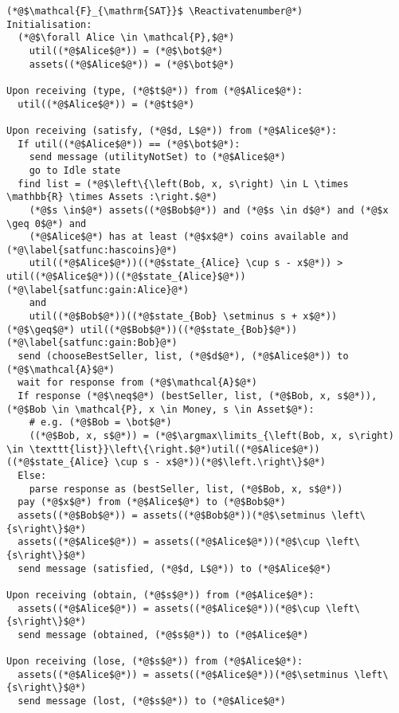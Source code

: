 \Suppressnumber
\begin{lstlisting}[label=satfunc, style=numbers]
(*@$\mathcal{F}_{\mathrm{SAT}}$ \Reactivatenumber@*)
Initialisation:
  (*@$\forall Alice \in \mathcal{P},$@*)
    util((*@$Alice$@*)) = (*@$\bot$@*)
    assets((*@$Alice$@*)) = (*@$\bot$@*)

Upon receiving (type, (*@$t$@*)) from (*@$Alice$@*):
  util((*@$Alice$@*)) = (*@$t$@*)

Upon receiving (satisfy, (*@$d, L$@*)) from (*@$Alice$@*):
  If util((*@$Alice$@*)) == (*@$\bot$@*):
    send message (utilityNotSet) to (*@$Alice$@*)
    go to Idle state
  find list = (*@$\left\{\left(Bob, x, s\right) \in L \times \mathbb{R} \times Assets :\right.$@*)
    (*@$s \in$@*) assets((*@$Bob$@*)) and (*@$s \in d$@*) and (*@$x \geq 0$@*) and
    (*@$Alice$@*) has at least (*@$x$@*) coins available and (*@\label{satfunc:hascoins}@*)
    util((*@$Alice$@*))((*@$state_{Alice} \cup s - x$@*)) > util((*@$Alice$@*))((*@$state_{Alice}$@*)) (*@\label{satfunc:gain:Alice}@*)
    and
    util((*@$Bob$@*))((*@$state_{Bob} \setminus s + x$@*)) (*@$\geq$@*) util((*@$Bob$@*))((*@$state_{Bob}$@*)) (*@\label{satfunc:gain:Bob}@*)
  send (chooseBestSeller, list, (*@$d$@*), (*@$Alice$@*)) to (*@$\mathcal{A}$@*)
  wait for response from (*@$\mathcal{A}$@*)
  If response (*@$\neq$@*) (bestSeller, list, (*@$Bob, x, s$@*)), (*@$Bob \in \mathcal{P}, x \in Money, s \in Asset$@*):
    # e.g. (*@$Bob = \bot$@*)
    ((*@$Bob, x, s$@*)) = (*@$\argmax\limits_{\left(Bob, x, s\right) \in \texttt{list}}\left\{\right.$@*)util((*@$Alice$@*))((*@$state_{Alice} \cup s - x$@*))(*@$\left.\right\}$@*)
  Else:
    parse response as (bestSeller, list, (*@$Bob, x, s$@*))
  pay (*@$x$@*) from (*@$Alice$@*) to (*@$Bob$@*)
  assets((*@$Bob$@*)) = assets((*@$Bob$@*))(*@$\setminus \left\{s\right\}$@*)
  assets((*@$Alice$@*)) = assets((*@$Alice$@*))(*@$\cup \left\{s\right\}$@*)
  send message (satisfied, (*@$d, L$@*)) to (*@$Alice$@*)

Upon receiving (obtain, (*@$s$@*)) from (*@$Alice$@*):
  assets((*@$Alice$@*)) = assets((*@$Alice$@*))(*@$\cup \left\{s\right\}$@*)
  send message (obtained, (*@$s$@*)) to (*@$Alice$@*)

Upon receiving (lose, (*@$s$@*)) from (*@$Alice$@*):
  assets((*@$Alice$@*)) = assets((*@$Alice$@*))(*@$\setminus \left\{s\right\}$@*)
  send message (lost, (*@$s$@*)) to (*@$Alice$@*)
\end{lstlisting}
